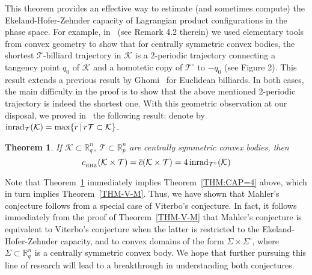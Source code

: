 \documentclass{icmart}
\newtheorem{theorem}{Theorem}[section]
\theoremstyle{definition}
\begin{document}
This theorem provides an effective way to estimate (and sometimes compute) the Ekeland-Hofer-Zehnder capacity of Lagrangian product configurations in the phase space. For example, in~\cite{AKO} (see Remark 4.2 therein) we used elementary tools from convex geometry to show that for centrally symmetric convex bodies, 
the shortest ${\mathcal T}$-billiard trajectory in ${\mathcal K}$ is a 2-periodic trajectory connecting a tangency point $q_0$ of ${\mathcal K}$ and a homotetic copy of $ {\mathcal T}^{\circ}$  to $-q_0$  (see Figure 2).  This result extends a previous result by Ghomi~\cite{Gh} for Euclidean billiards. 
In both cases, the main difficulty in the proof is to show 
that the above mentioned 2-periodic trajectory is indeed the shortest one. 
With this geometric observation at our disposal, we proved in~\cite{AKO}  the following result: denote by 
${\rm inrad}_{{\mathcal T}}({\mathcal K})  =  \max \{r \, | \, r{\mathcal T} \subset {\mathcal K} \}$. %


\begin{theorem} \label{Main-Theorem-From-AKO}
If ${\mathcal K}  \subset {\mathbb R}^n_q$, ${\mathcal T} \subset {\mathbb R}^n_p$ are centrally symmetric convex bodies, then
$$c_{_{\rm EHZ}}({\mathcal K}  \times {\mathcal T}) =  \overline c({\mathcal K}  \times {\mathcal T}) =  4 \, {\rm inrad}_{{\mathcal T}^{\circ}}({\mathcal K})$$%
\end{theorem}
Note that Theorem~\ref{Main-Theorem-From-AKO} immediately implies Theorem~\ref{THM:CAP=4}  above, which in turn implies Theorem~\ref{THM-V-M}.
Thus, we have shown that Mahler's conjecture follows 
from a special case of Viterbo's conjecture.  %
In fact, it follows immediately from the proof of Theorem~\ref{THM-V-M}  that Mahler's conjecture is equivalent to Viterbo's conjecture when the latter is restricted to the Ekeland-Hofer-Zehnder capacity, and to convex domains of the form $\Sigma \times \Sigma^{\circ}$, where $\Sigma \subset {\mathbb R}^n_q$ is a centrally symmetric convex body.  We hope that further pursuing this line of research will lead to a  breakthrough in understanding both conjectures.
\end{document}
